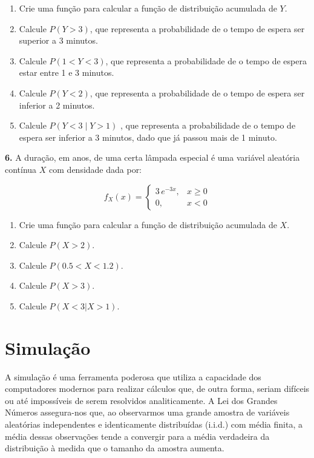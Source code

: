 \documentclass[
]{book}
\begin{document}
\begin{enumerate}
\def\labelenumi{(\alph{enumi})}
\item
  Crie uma função para calcular a função de distribuição acumulada de \(Y\).
\item
  Calcule \(P(Y > 3)\), que representa a probabilidade de o tempo de espera ser superior a 3 minutos.
\item
  Calcule \(P(1 < Y < 3)\), que representa a probabilidade de o tempo de espera estar entre 1 e 3 minutos.
\item
  Calcule \(P(Y < 2)\), que representa a probabilidade de o tempo de espera ser inferior a 2 minutos.
\item
  Calcule \(P(Y < 3 \mid Y > 1)\) , que representa a probabilidade de o tempo de espera ser inferior a 3 minutos, dado que já passou mais de 1 minuto.
\end{enumerate}

\textbf{6.} A duração, em anos, de uma certa lâmpada especial é uma variável aleatória contínua \(X\) com densidade dada por:

\[
f_{X}(x) = 
\begin{cases} 
3\,e^{-3x}, & x\geq0 \\[10pt]
0,& x<0
\end{cases}
\]

\begin{enumerate}
\def\labelenumi{(\alph{enumi})}
\item
  Crie uma função para calcular a função de distribuição acumulada de \(X\).
\item
  Calcule \(P(X>2)\).
\item
  Calcule \(P(0.5 < X <1.2)\).
\item
  Calcule \(P(X>3)\).
\item
  Calcule \(P(X<3 | X>1)\).
\end{enumerate}

\chapter{Simulação}\label{simulauxe7uxe3o}

A simulação é uma ferramenta poderosa que utiliza a capacidade dos
computadores modernos para realizar cálculos que, de outra forma, seriam
difíceis ou até impossíveis de serem resolvidos analiticamente. A Lei
dos Grandes Números assegura-nos que, ao observarmos uma grande amostra
de variáveis aleatórias independentes e identicamente distribuídas
(i.i.d.) com média finita, a média dessas observações tende a convergir
para a média verdadeira da distribuição à medida que o tamanho da
amostra aumenta.
\end{document}
